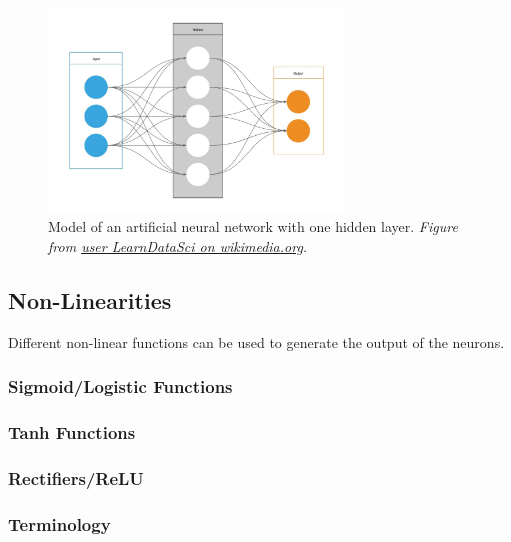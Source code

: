 \documentclass[
]{book}
\begin{document}
\begin{figure}
\hypertarget{CDF}{%
\centering
\includegraphics[width=0.7\textwidth,height=\textheight]{./figures/Artificial_Neural_Network.jpg}
\caption{Model of an artificial neural network with one hidden layer. \emph{Figure
from \href{https://commons.wikimedia.org/wiki/File:Artificial_Neural_Network.jpg}{user LearnDataSci on
wikimedia.org}.}}\label{CDF}
}
\end{figure}

\hypertarget{non-linearities}{%
\subsection{Non-Linearities}\label{non-linearities}}

Different non-linear functions can be used to generate the output of the
neurons.

\hypertarget{sigmoidlogistic-functions}{%
\subsubsection{Sigmoid/Logistic Functions}\label{sigmoidlogistic-functions}}

\hypertarget{tanh-functions}{%
\subsubsection{Tanh Functions}\label{tanh-functions}}

\hypertarget{rectifiersrelu}{%
\subsubsection{Rectifiers/ReLU}\label{rectifiersrelu}}

\hypertarget{terminology-1}{%
\subsubsection{Terminology}\label{terminology-1}}
\end{document}
